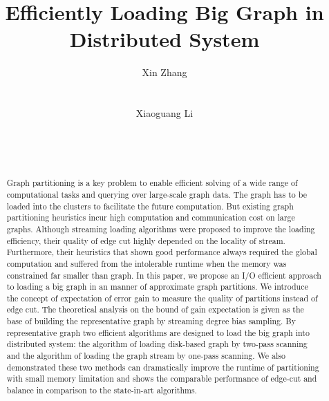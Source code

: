 \documentclass{sig-alternate-2013}
\begin{document}
\title{Efficiently Loading Big Graph in Distributed System
}

\author{
\alignauthor
Xin Zhang\\
       \\
       \\
\alignauthor
Xiaoguang Li\\
       \\
       \\
       \\
}
\maketitle

\begin{abstract}
Graph partitioning is a key problem to enable efficient solving of a wide range of computational tasks and querying over large-scale graph data. The graph has to be loaded into the clusters to facilitate the future computation. But existing graph partitioning heuristics incur high computation and communication cost on large graphs. Although streaming loading algorithms were proposed to improve the loading efficiency, their quality of edge cut highly depended on the locality of stream. Furthermore, their heuristics that shown good performance always required the global computation and suffered from the intolerable runtime when the memory was constrained far smaller than graph.
In this paper, we propose an I/O efficient approach to loading a big graph in an manner of approximate graph partitions.
We introduce the concept of expectation of error gain to measure the quality of partitions instead of edge cut.
The theoretical analysis on the bound of gain expectation is given as the base of building the representative graph by streaming degree bias sampling. By representative graph two efficient algorithms are designed to load the big graph into distributed system: the algorithm of loading disk-based graph by two-pass scanning and the algorithm of loading the graph stream by one-pass scanning. We also demonstrated these two methods can dramatically improve the runtime of partitioning with small memory limitation and shows the comparable performance of edge-cut and balance in comparison to the state-in-art algorithms.

\end{abstract}
\end{document}
